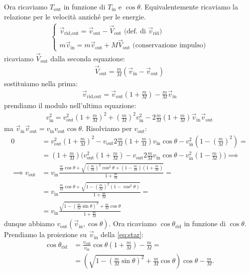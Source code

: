Ora ricaviamo $T_\text{out}$ in funzione di $T_\text{in}$ e $\cos\theta$.
Equivalentemente ricaviamo la relazione per le velocità anziché per le energie.
\begin{align*}
	\begin{cases}
		\vec v_\text{rid,out} = \vec v_\text{out} - \vec V_\text{out} \text{ (def. di $\vec v_\text{rid}$)}\\
		m \vec v_\text{in} = m \vec v_\text{out} + M \vec V_\text{out} \text{ (conservazione impulso)}
	\end{cases}
\end{align*}
ricaviamo $\vec V_\text{out}$ dalla seconda equazione:
\begin{align*}
	\vec V_\text{out} = \frac mM (\vec v_\text{in} - \vec v_\text{out})
\end{align*}
sostituiamo nella prima:
\begin{align}
	\label{eq:star}
	\vec v_\text{rid,out}
	= \vec v_\text{out} \left(1 + \frac mM\right) - \frac mM \vec v_\text{in}
\end{align}
prendiamo il modulo nell'ultima equazione:
\begin{align*}
	v_\text{in}^2
	= v_\text{out}^2 \left(1 + \frac mM\right)^2 + \left(\frac mM\right)^2 v_\text{in}^2
	- 2 \frac mM \left(1 + \frac mM\right) \vec v_\text{in} \vec v_\text{out}
\end{align*}
ma $\vec v_\text{in}\vec v_\text{out} = v_\text{in} v_\text{out} \cos\theta$.
Risolviamo per $v_\text{out}$:
\begin{align*}
	0
	&= v_\text{out}^2 \left(1 + \frac mM\right)^2
	- v_\text{out} 2\frac mM\left(1 + \frac mM\right) v_\text{in} \cos\theta
	- v_\text{in}^2 \left(1 - \left(\frac mM\right)^2 \right) = \\
	&= \left(1 + \frac mM\right) \Bigg(
   v_\text{out}^2 \left(1 + \frac mM\right)
  	- v_\text{out} 2\frac mM v_\text{in} \cos\theta
  	- v_\text{in}^2 \left(1 - \frac mM\right)
	\Bigg) \implies \\
	\implies v_\text{out}
	&= v_\text{in} \frac
	{\frac mM \cos\theta + \sqrt{\left(\frac mM\right)^2 \cos^2\theta + \left(1-\frac mM\right)\left(1+\frac mM\right)}}
	{1 + \frac mM} = \\
	&= v_\text{in} \frac
	{\frac mM \cos\theta + \sqrt{1 - \left(\frac mM\right)^2 (1-\cos^2\theta)}}
	{1 + \frac mM} = \\
	&= v_\text{in} \frac
	{\sqrt{1 - \left(\frac mM\sin\theta\right)^2} + \frac mM\cos\theta}
	{1 + \frac mM}
\end{align*}
dunque abbiamo $v_\text{out}(\vec v_\text{in},\cos\theta)$.
Ora ricaviamo $\cos\theta_\text{rid}$ in funzione di $\cos\theta$.
Prendiamo la proiezione su $\vec v_\text{in}$ della \eqref{eq:star}:
\begin{align*}
	\cos\theta_\text{rid}
	&= \frac{v_\text{out}}{v_\text{in}} \cos\theta \left(1+\frac mM\right) - \frac mM = \\
	&= \left( \sqrt{1 - \left(\frac mM \sin\theta\right)^2} + \frac mM \cos\theta \right) \cos\theta - \frac mM.
\end{align*}
